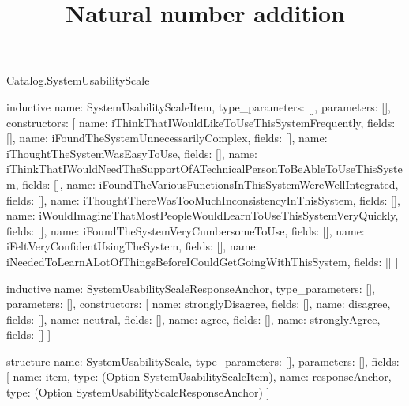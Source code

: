 \begin{lexlean}{Catalog.SystemUsabilityScale}
\title{Natural number addition}
\begin{semanticmodule}
inductive{
  name: SystemUsabilityScaleItem,
  type_parameters: [],
  parameters: [],
  constructors: [
    {name: iThinkThatIWouldLikeToUseThisSystemFrequently, fields: []},
    {name: iFoundTheSystemUnnecessarilyComplex, fields: []},
    {name: iThoughtTheSystemWasEasyToUse, fields: []},
    {name: iThinkThatIWouldNeedTheSupportOfATechnicalPersonToBeAbleToUseThisSystem, fields: []},
    {name: iFoundTheVariousFunctionsInThisSystemWereWellIntegrated, fields: []},
    {name: iThoughtThereWasTooMuchInconsistencyInThisSystem, fields: []},
    {name: iWouldImagineThatMostPeopleWouldLearnToUseThisSystemVeryQuickly, fields: []},
    {name: iFoundTheSystemVeryCumbersomeToUse, fields: []},
    {name: iFeltVeryConfidentUsingTheSystem, fields: []},
    {name: iNeededToLearnALotOfThingsBeforeICouldGetGoingWithThisSystem, fields: []}
  ]
}

inductive{
  name: SystemUsabilityScaleResponseAnchor,
  type_parameters: [],
  parameters: [],
  constructors: [
    {name: stronglyDisagree, fields: []},
    {name: disagree, fields: []},
    {name: neutral, fields: []},
    {name: agree, fields: []},
    {name: stronglyAgree, fields: []}
  ]
}

structure{
  name: SystemUsabilityScale,
  type_parameters: [],
  parameters: [],
  fields: [
    {name: item, type: (Option SystemUsabilityScaleItem)},
    {name: responseAnchor, type: (Option SystemUsabilityScaleResponseAnchor)}
  ]
}
\end{semanticmodule}
\end{lexlean}
